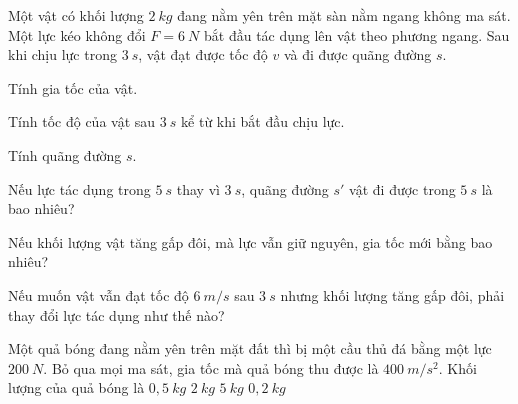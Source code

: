 
\begin{vidu}
Một vật có khối lượng $2\ kg$ đang nằm yên trên mặt sàn nằm ngang không ma sát. Một lực kéo không đổi $F = 6\ N$ bắt đầu tác dụng lên vật theo phương ngang. Sau khi chịu lực trong $3\ s$, vật đạt được tốc độ $v$ và đi được quãng đường $s$.
\begin{listEX}
\item Tính gia tốc của vật.
\item Tính tốc độ của vật sau $3\ s$ kể từ khi bắt đầu chịu lực.
\item Tính quãng đường $s$.
\item Nếu lực tác dụng trong $5\ s$ thay vì $3\ s$, quãng đường $s'$ vật đi được trong $5\ s$ là bao nhiêu?
\item Nếu khối lượng vật tăng gấp đôi, mà lực vẫn giữ nguyên, gia tốc mới bằng bao nhiêu?
\item Nếu muốn vật vẫn đạt tốc độ $6\ m/s$ sau $3\ s$ nhưng khối lượng tăng gấp đôi, phải thay đổi lực tác dụng như thế nào?
\end{listEX}
\end{vidu}
\begin{vidu}%
Một quả bóng đang nằm yên trên mặt đất thì bị một cầu thủ đá bằng một lực $200\ N$. Bỏ qua mọi ma sát, gia tốc mà quả bóng thu được là $400\ m/s^2$. Khối lượng của quả bóng là
\choice
{\True $0,5\ kg$}
{$2\ kg$}
{$5\ kg$}
{$0,2\ kg$}
 \end{vidu}
